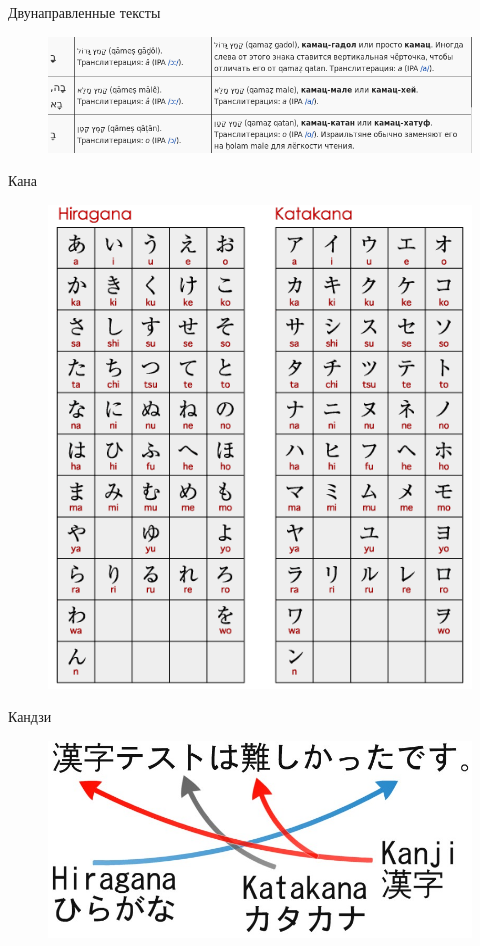 \documentclass{beamer}
\begin{document}
\begin{frame}{Двунаправленные тексты}
\begin{figure}[H]
    \includegraphics[scale=0.4]{bidirectional.png} 
\end{figure}
\end{frame}

\begin{frame}{Кана}
\begin{figure}[H]
    \includegraphics[scale=0.35]{kana.png} 
\end{figure}
\end{frame}

\begin{frame}{Кандзи}
\begin{figure}[H]
    \includegraphics[scale=0.3]{kanji.jpg} 
\end{figure}
\end{frame}
\end{document}

